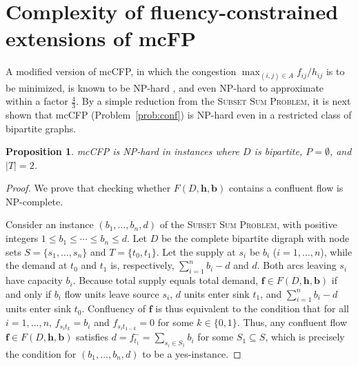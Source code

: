 \documentclass[pdflatex,sn-mathphys-num]{sn-jnl}%
\theoremstyle{thmstyleone}%
\newtheorem{proposition}[theorem]{Proposition}%
\begin{document}
\section{Complexity of fluency-constrained extensions of mcFP} \label{sec:compl}
A modified version of mcCFP, in which the congestion $\max_{(i,j)\in A}f_{ij}/h_{ij}$ is to be minimized, is known to be NP-hard \cite{chen06}, and even NP-hard to approximate within a factor
$\tfrac{4}{3}$.
By a simple reduction from the \textsc{Subset Sum Problem},
it is next shown that mcCFP (Problem~\ref{prob:conf}) is NP-hard even in a restricted class of bipartite graphs.
\begin{proposition} \label{prop:conf}
mcCFP is NP-hard in instances where $D$ is bipartite, $P=\emptyset$, and $|T|=2$.
\end{proposition}
\begin{proof}
We prove that checking whether $F(D,\boldsymbol{h},\boldsymbol{b})$ contains a confluent flow is NP-complete.

Consider an instance $(b_1,\ldots,b_n,d)$ of the \textsc{Subset Sum Problem}, with positive integers $1\leq b_1\leq\cdots\leq b_n\leq d$.
Let $D$ be the complete bipartite digraph with node sets $S=\{s_1,\ldots,s_n\}$ and $T=\{t_0,t_1\}$.
Let the supply at $s_i$ be $b_i$ ($i=1,\ldots,n$), while the demand at $t_0$ and $t_1$ is, respectively, $\sum_{i=1}^nb_i-d$ and $d$.
Both arcs leaving $s_i$ have capacity $b_i$.
Because total supply equals total demand, $\boldsymbol{f}\in F(D,\boldsymbol{h},\boldsymbol{b})$ if and only if $b_i$ flow units leave source $s_i$,
$d$ units enter sink $t_1$, and $\sum_{i=1}^nb_i-d$ units enter sink $t_0$.
Confluency of $\boldsymbol{f}$ is thus equivalent to the condition that for all $i=1,\ldots,n$, $f_{s_it_k}=b_i$ and $f_{s_it_{1-k}}=0$ for some $k\in\{0,1\}$.
Thus, any confluent flow $\boldsymbol{f}\in F(D,\boldsymbol{h},\boldsymbol{b})$ satisfies $d=f_{t_1}^-=\sum_{s_i\in S_1}b_i$ for some $S_1\subseteq S$,
which is precisely the condition for $(b_1,\ldots,b_n,d)$ to be a yes-instance.
\end{proof}
\end{document}
